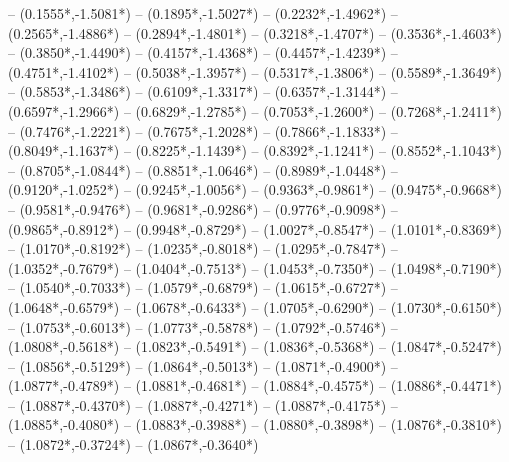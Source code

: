 {	-- ({0.1555*\dx},{-1.5081*\dy})
	-- ({0.1895*\dx},{-1.5027*\dy})
	-- ({0.2232*\dx},{-1.4962*\dy})
	-- ({0.2565*\dx},{-1.4886*\dy})
	-- ({0.2894*\dx},{-1.4801*\dy})
	-- ({0.3218*\dx},{-1.4707*\dy})
	-- ({0.3536*\dx},{-1.4603*\dy})
	-- ({0.3850*\dx},{-1.4490*\dy})
	-- ({0.4157*\dx},{-1.4368*\dy})
	-- ({0.4457*\dx},{-1.4239*\dy})
	-- ({0.4751*\dx},{-1.4102*\dy})
	-- ({0.5038*\dx},{-1.3957*\dy})
	-- ({0.5317*\dx},{-1.3806*\dy})
	-- ({0.5589*\dx},{-1.3649*\dy})
	-- ({0.5853*\dx},{-1.3486*\dy})
	-- ({0.6109*\dx},{-1.3317*\dy})
	-- ({0.6357*\dx},{-1.3144*\dy})
	-- ({0.6597*\dx},{-1.2966*\dy})
	-- ({0.6829*\dx},{-1.2785*\dy})
	-- ({0.7053*\dx},{-1.2600*\dy})
	-- ({0.7268*\dx},{-1.2411*\dy})
	-- ({0.7476*\dx},{-1.2221*\dy})
	-- ({0.7675*\dx},{-1.2028*\dy})
	-- ({0.7866*\dx},{-1.1833*\dy})
	-- ({0.8049*\dx},{-1.1637*\dy})
	-- ({0.8225*\dx},{-1.1439*\dy})
	-- ({0.8392*\dx},{-1.1241*\dy})
	-- ({0.8552*\dx},{-1.1043*\dy})
	-- ({0.8705*\dx},{-1.0844*\dy})
	-- ({0.8851*\dx},{-1.0646*\dy})
	-- ({0.8989*\dx},{-1.0448*\dy})
	-- ({0.9120*\dx},{-1.0252*\dy})
	-- ({0.9245*\dx},{-1.0056*\dy})
	-- ({0.9363*\dx},{-0.9861*\dy})
	-- ({0.9475*\dx},{-0.9668*\dy})
	-- ({0.9581*\dx},{-0.9476*\dy})
	-- ({0.9681*\dx},{-0.9286*\dy})
	-- ({0.9776*\dx},{-0.9098*\dy})
	-- ({0.9865*\dx},{-0.8912*\dy})
	-- ({0.9948*\dx},{-0.8729*\dy})
	-- ({1.0027*\dx},{-0.8547*\dy})
	-- ({1.0101*\dx},{-0.8369*\dy})
	-- ({1.0170*\dx},{-0.8192*\dy})
	-- ({1.0235*\dx},{-0.8018*\dy})
	-- ({1.0295*\dx},{-0.7847*\dy})
	-- ({1.0352*\dx},{-0.7679*\dy})
	-- ({1.0404*\dx},{-0.7513*\dy})
	-- ({1.0453*\dx},{-0.7350*\dy})
	-- ({1.0498*\dx},{-0.7190*\dy})
	-- ({1.0540*\dx},{-0.7033*\dy})
	-- ({1.0579*\dx},{-0.6879*\dy})
	-- ({1.0615*\dx},{-0.6727*\dy})
	-- ({1.0648*\dx},{-0.6579*\dy})
	-- ({1.0678*\dx},{-0.6433*\dy})
	-- ({1.0705*\dx},{-0.6290*\dy})
	-- ({1.0730*\dx},{-0.6150*\dy})
	-- ({1.0753*\dx},{-0.6013*\dy})
	-- ({1.0773*\dx},{-0.5878*\dy})
	-- ({1.0792*\dx},{-0.5746*\dy})
	-- ({1.0808*\dx},{-0.5618*\dy})
	-- ({1.0823*\dx},{-0.5491*\dy})
	-- ({1.0836*\dx},{-0.5368*\dy})
	-- ({1.0847*\dx},{-0.5247*\dy})
	-- ({1.0856*\dx},{-0.5129*\dy})
	-- ({1.0864*\dx},{-0.5013*\dy})
	-- ({1.0871*\dx},{-0.4900*\dy})
	-- ({1.0877*\dx},{-0.4789*\dy})
	-- ({1.0881*\dx},{-0.4681*\dy})
	-- ({1.0884*\dx},{-0.4575*\dy})
	-- ({1.0886*\dx},{-0.4471*\dy})
	-- ({1.0887*\dx},{-0.4370*\dy})
	-- ({1.0887*\dx},{-0.4271*\dy})
	-- ({1.0887*\dx},{-0.4175*\dy})
	-- ({1.0885*\dx},{-0.4080*\dy})
	-- ({1.0883*\dx},{-0.3988*\dy})
	-- ({1.0880*\dx},{-0.3898*\dy})
	-- ({1.0876*\dx},{-0.3810*\dy})
	-- ({1.0872*\dx},{-0.3724*\dy})
	-- ({1.0867*\dx},{-0.3640*\dy})
}
